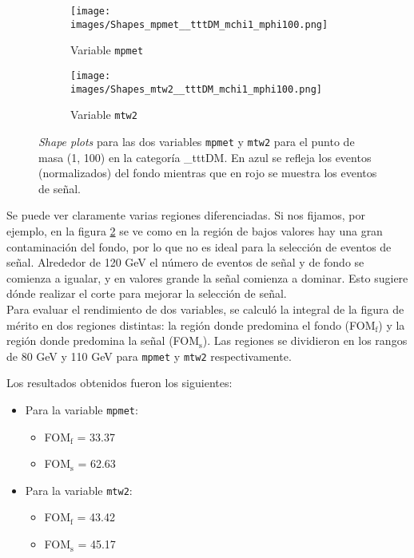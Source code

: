 \begin{figure}[h!]
     \centering
     \begin{subfigure}[b]{0.43\textwidth}
         \centering
        \texttt{[image: images/Shapes\_mpmet\_\_tttDM\_mchi1\_mphi100.png]}
         \caption{Variable \texttt{mpmet}}
         \label{fig: Shapes_signal_bckg_mpmet}
     \end{subfigure}
     \begin{subfigure}[b]{0.43\textwidth}
         \centering
         \texttt{[image: images/Shapes\_mtw2\_\_tttDM\_mchi1\_mphi100.png]}
         \caption{Variable \texttt{mtw2}}
         \label{fig: Shapes_signal_bckg_mtw2}
     \end{subfigure}
     \hfill
     \caption{\textit{Shape plots} para las dos variables \texttt{mpmet} y \texttt{mtw2} para el punto de masa (1, 100) en la categoría \_tttDM. En azul se refleja los eventos (normalizados) del fondo mientras que en rojo se muestra los eventos de señal.}
     \label{fig:Shapes_signal_bckg}
\end{figure}

Se puede ver claramente varias regiones diferenciadas. Si nos fijamos, por ejemplo, en la figura \ref{fig: Shapes_signal_bckg_mtw2} se ve como en la región de bajos valores hay una gran contaminación del fondo, por lo que no es ideal para la selección de eventos de señal. Alrededor de 120 GeV el número de eventos de señal y de fondo se comienza a igualar, y en valores grande la señal comienza a dominar. Esto sugiere dónde realizar el corte para mejorar la selección de señal.\\


Para evaluar el rendimiento de dos variables, se calculó la integral de la figura de mérito  en dos regiones distintas: la región donde predomina el fondo (FOM$_\text{f}$) y la región donde predomina la señal (FOM$_\text{s}$). Las regiones se dividieron en los rangos de 80 GeV y 110 GeV para \texttt{mpmet} y \texttt{mtw2} respectivamente.

Los resultados obtenidos fueron los siguientes:

\begin{itemize}
    \item Para la variable \texttt{mpmet}:
        \begin{itemize}
            \item FOM$_\text{f}$ = 33.37
            \item FOM$_\text{s}$ = 62.63
        \end{itemize}
    \item Para la variable \texttt{mtw2}:
        \begin{itemize}
            \item FOM$_\text{f}$ = 43.42
            \item FOM$_\text{s}$ = 45.17
        \end{itemize}
\end{itemize}

